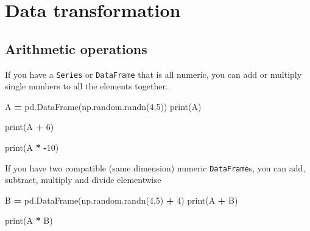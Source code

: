 \documentclass[
  letterpaper,
]{scrbook}
\newenvironment{Shaded}{\begin{snugshade}}{\end{snugshade}}
\newcommand{\BuiltInTok}[1]{#1}
\newcommand{\DecValTok}[1]{\textcolor[rgb]{0.00,0.00,0.81}{#1}}
\newcommand{\NormalTok}[1]{#1}
\newcommand{\OperatorTok}[1]{\textcolor[rgb]{0.81,0.36,0.00}{\textbf{#1}}}
\begin{document}
\hypertarget{data-transformation}{%
\section{Data transformation}\label{data-transformation}}

\hypertarget{arithmetic-operations}{%
\subsection{Arithmetic operations}\label{arithmetic-operations}}

If you have a \texttt{Series} or \texttt{DataFrame} that is all numeric, you can add or multiply single numbers to all the elements together.

\begin{Shaded}
\begin{Highlighting}[]
\NormalTok{A }\OperatorTok{=}\NormalTok{ pd.DataFrame(np.random.randn(}\DecValTok{4}\NormalTok{,}\DecValTok{5}\NormalTok{))}
\BuiltInTok{print}\NormalTok{(A)}
\end{Highlighting}
\end{Shaded}

\begin{Shaded}
\begin{Highlighting}[]
\BuiltInTok{print}\NormalTok{(A }\OperatorTok{+} \DecValTok{6}\NormalTok{)}
\end{Highlighting}
\end{Shaded}

\begin{Shaded}
\begin{Highlighting}[]
\BuiltInTok{print}\NormalTok{(A }\OperatorTok{*} \OperatorTok{{-}}\DecValTok{10}\NormalTok{)}
\end{Highlighting}
\end{Shaded}

If you have two compatible (same dimension) numeric \texttt{DataFrame}s, you can add, subtract, multiply and divide elementwise

\begin{Shaded}
\begin{Highlighting}[]
\NormalTok{B }\OperatorTok{=}\NormalTok{ pd.DataFrame(np.random.randn(}\DecValTok{4}\NormalTok{,}\DecValTok{5}\NormalTok{) }\OperatorTok{+} \DecValTok{4}\NormalTok{)}
\BuiltInTok{print}\NormalTok{(A }\OperatorTok{+}\NormalTok{ B)}
\end{Highlighting}
\end{Shaded}

\begin{Shaded}
\begin{Highlighting}[]
\BuiltInTok{print}\NormalTok{(A }\OperatorTok{*}\NormalTok{ B)}
\end{Highlighting}
\end{Shaded}
\end{document}
